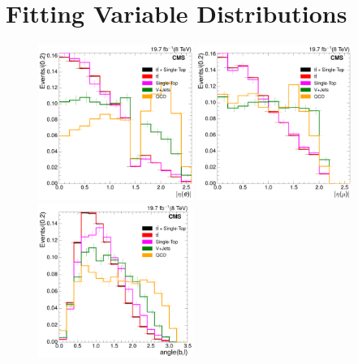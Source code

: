 \section{Fitting Variable Distributions}
\label{as:fitting_variables_distributions}
\begin{figure}[H]
    \centering
     \includegraphics[width=0.45\textwidth]{Chapters/04_Analysis/04b_XSections/images/8TeV/fit_variables/electron/MET/electron_absolute_eta/MET_inclusive_electron_absolute_eta_2orMoreBtags_templates.pdf}\hfill
     \includegraphics[width=0.45\textwidth]{Chapters/04_Analysis/04b_XSections/images/8TeV/fit_variables/muon/MET/muon_absolute_eta/MET_inclusive_muon_absolute_eta_2orMoreBtags_templates.pdf}\\
     \includegraphics[width=0.45\textwidth]{Chapters/04_Analysis/04b_XSections/images/8TeV/fit_variables/electron/MET/angle_bl/MET_inclusive_angle_bl_2orMoreBtags_templates.pdf}\hfill

\end{figure}
